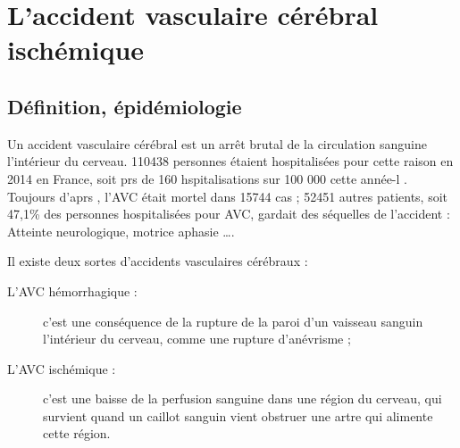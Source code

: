 \section{L'accident vasculaire c\'er\'ebral isch\'emique}




\subsection{D\'efinition, \'epid\'emiologie}

Un accident vasculaire c\'er\'ebral est un arr\^et brutal de la circulation sanguine  l'int\'erieur du cerveau. %
110438 personnes \'etaient hospitalis\'ees pour cette raison en 2014 en France, soit prs de 160 hspitalisations sur 100 000 cette ann\'ee-l \cite{epi_hem16}. %
Toujours d'aprs \cite{epi_hem16}, l'AVC \'etait mortel dans 15744 cas ; %
52451 autres patients, soit 47,1\% des personnes hospitalis\'ees pour AVC, gardait des s\'equelles de l'accident : %
Atteinte neurologique, motrice aphasie \dots.

\par
Il existe deux sortes d'accidents vasculaires c\'er\'ebraux :
\begin{description}
\item[L'AVC h\'emorrhagique : ] c'est une cons\'equence de la rupture de la paroi d'un vaisseau sanguin  l'int\'erieur du cerveau, comme une rupture d'an\'evrisme ;
\item[L'AVC isch\'emique : ] c'est une baisse de la perfusion sanguine dans une r\'egion du cerveau, %
qui survient quand un caillot sanguin vient obstruer une artre qui alimente cette r\'egion.
\end{description}

